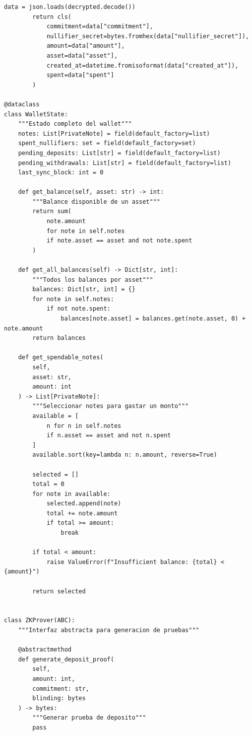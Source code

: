 \documentclass[11pt,a4paper,twoside]{book}
\theoremstyle{definition}
\theoremstyle{remark}
\begin{document}
\begin{lstlisting}[style=python, caption={Arquitectura de wallet con soporte ZK}]
        data = json.loads(decrypted.decode())
        return cls(
            commitment=data["commitment"],
            nullifier_secret=bytes.fromhex(data["nullifier_secret"]),
            amount=data["amount"],
            asset=data["asset"],
            created_at=datetime.fromisoformat(data["created_at"]),
            spent=data["spent"]
        )

@dataclass
class WalletState:
    """Estado completo del wallet"""
    notes: List[PrivateNote] = field(default_factory=list)
    spent_nullifiers: set = field(default_factory=set)
    pending_deposits: List[str] = field(default_factory=list)
    pending_withdrawals: List[str] = field(default_factory=list)
    last_sync_block: int = 0
    
    def get_balance(self, asset: str) -> int:
        """Balance disponible de un asset"""
        return sum(
            note.amount 
            for note in self.notes 
            if note.asset == asset and not note.spent
        )
    
    def get_all_balances(self) -> Dict[str, int]:
        """Todos los balances por asset"""
        balances: Dict[str, int] = {}
        for note in self.notes:
            if not note.spent:
                balances[note.asset] = balances.get(note.asset, 0) + note.amount
        return balances
    
    def get_spendable_notes(
        self, 
        asset: str, 
        amount: int
    ) -> List[PrivateNote]:
        """Seleccionar notes para gastar un monto"""
        available = [
            n for n in self.notes 
            if n.asset == asset and not n.spent
        ]
        available.sort(key=lambda n: n.amount, reverse=True)
        
        selected = []
        total = 0
        for note in available:
            selected.append(note)
            total += note.amount
            if total >= amount:
                break
        
        if total < amount:
            raise ValueError(f"Insufficient balance: {total} < {amount}")
        
        return selected


class ZKProver(ABC):
    """Interfaz abstracta para generacion de pruebas"""
    
    @abstractmethod
    def generate_deposit_proof(
        self,
        amount: int,
        commitment: str,
        blinding: bytes
    ) -> bytes:
        """Generar prueba de deposito"""
        pass
    

\end{lstlisting}
\end{document}
